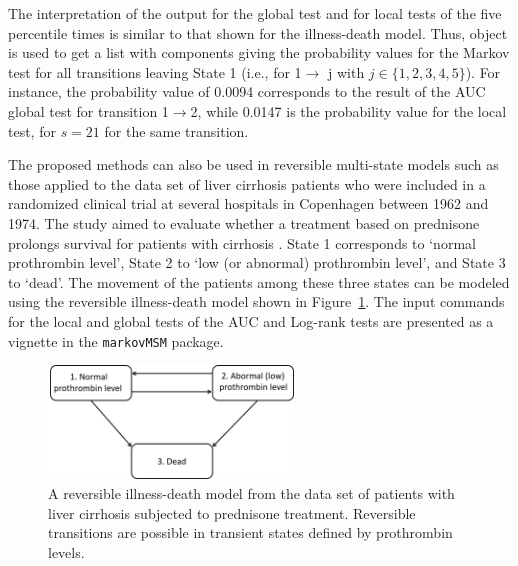 
The interpretation of the output for the global test and for local tests of the five percentile times is similar to that shown for the illness-death model. Thus, object  is used to get a list with components giving the probability values for the Markov test for all transitions leaving State 1 (i.e., for 1$\rightarrow$ j with $j\in \{1,2,3,4,5\}$). For instance, the probability value of 0.0094 corresponds to the result of the AUC global test for transition 1$\rightarrow$2, while 0.0147 is the probability value for the local test, for $s=21$ for the same transition. 

The proposed methods can also be used in reversible multi-state models such as those applied to the data set of liver cirrhosis patients who were included in a randomized clinical trial at several hospitals in Copenhagen between 1962 and 1974. The study aimed to evaluate whether a treatment based on prednisone prolongs survival for patients with cirrhosis \cite{Andersen1993}. State 1 corresponds to `normal prothrombin level', State 2 to `low (or abnormal) prothrombin level', and State 3 to `dead'. The movement of the patients among these three states can be modeled using the reversible illness-death model shown in Figure~\ref{fig9}. The input commands for the local and global tests of the AUC and Log-rank tests are presented as a vignette in the \texttt{markovMSM} package.


\begin{figure}[t] %
\centering
\includegraphics[width=6.5cm]{IDM_liver.pdf}
\caption {A reversible illness-death model from the data set of patients with liver cirrhosis subjected to prednisone treatment. Reversible transitions are possible in transient states defined by prothrombin levels.} \label{fig9}
\end{figure}



